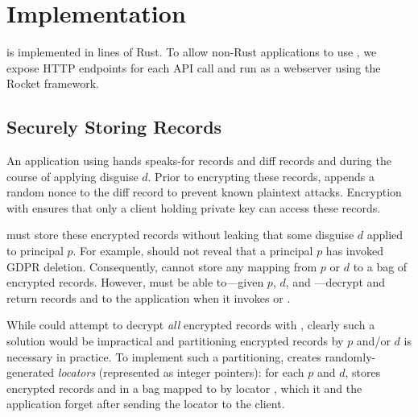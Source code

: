 \section{Implementation}

\sys is implemented in  lines of Rust. To allow non-Rust applications to use \sys, we
expose HTTP endpoints for each \sys API call and run \sys as a webserver using the Rocket framework.

\subsection{Securely Storing Records} 
%
An application using \sys hands \sys speaks-for records  and diff records and 
during the course of applying disguise $d$.
%
Prior to encrypting these records, \sys appends a random nonce to the diff record to prevent known
plaintext attacks. Encryption with  ensures that only a client holding private key 
can access these records.

\sys must store these encrypted records without leaking that some disguise $d$ applied to principal
$p$.  For example, \sys should not reveal that a principal $p$ has invoked GDPR deletion.  
%
Consequently, \sys cannot store any mapping from $p$ or $d$ to a bag of encrypted records.  However,
\sys must be able to---given $p$, $d$, and ---decrypt and return records  and
 to the application when it invokes  or .

While \sys could attempt to decrypt \emph{all} encrypted records with ,
clearly such a solution would be impractical and partitioning encrypted records by $p$ and/or $d$ is
necessary in practice.  To implement such a partitioning, \sys creates randomly-generated
\emph{locators}  (represented as integer pointers): for each $p$ and $d$, \sys stores
encrypted records  and  in a bag mapped to by  locator , which it and
the application forget after sending the locator to the client.
 

